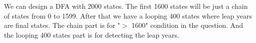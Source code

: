 \documentclass{article}
\begin{document}
We can design a DFA with 2000 states. The first 1600 states will be just a chain of states from 0 to 1599. After that we have a looping 400 states where leap years are final states.
The chain part is for "\(>\) 1600" condition in the question. And the looping 400 states part is for detecting the leap years.
\end{document}
